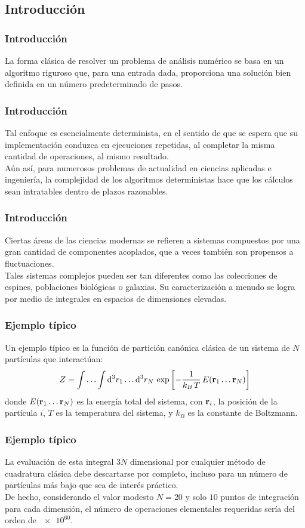 \subsection{Introducción}
\begin{frame}
\frametitle{Introducción}
La forma clásica de resolver un problema de análisis numérico se basa en un algoritmo riguroso que, para una entrada dada, proporciona una solución bien definida en un número predeterminado de pasos.
\end{frame}
\begin{frame}
\frametitle{Introducción}
Tal enfoque es esencialmente determinista, en el sentido de que se espera que su implementación conduzca en ejecuciones repetidas, al completar la misma cantidad de operaciones, al mismo resultado.
\\
\bigskip
\pause
Aún así, para numerosos problemas de actualidad en ciencias aplicadas e ingeniería, la complejidad de los algoritmos deterministas hace que los cálculos sean intratables dentro de plazos razonables.
\end{frame}
\begin{frame}
\frametitle{Introducción}
Ciertas áreas de las ciencias modernas se refieren a sistemas compuestos por una gran cantidad de componentes acoplados, que a veces también son propensos a fluctuaciones.
\\
\bigskip
Tales sistemas complejos pueden ser tan diferentes como las colecciones de espines, poblaciones biológicas o galaxias. Su caracterización a menudo se logra por medio de integrales en espacios de dimensiones elevadas.
\end{frame}
\begin{frame}
\frametitle{Ejemplo típico}
Un ejemplo típico es la función de partición canónica clásica de un sistema de $N$ partículas que interactúan:
\begin{align*}
Z = \int \ldots \int \dd[3]{r_{1}} \ldots \dd[3]{r_{N}} \, \exp \left[ - \dfrac{1}{k_{B} \, T} \, E (\vb{r}_{1} \ldots \vb{r}_{N}) \right]
\end{align*}
donde $E (\vb{r}_{1} \ldots \vb{r}_{N})$ es la energía total del sistema, con $\vb{r}_{i}$, la posición de la partícula $i$, $T$ es la temperatura del sistema, y $k_{B}$ es la constante de Boltzmann.
\end{frame}
\begin{frame}
\frametitle{Ejemplo típico}
La evaluación de esta integral $3N$ dimensional por cualquier método de cuadratura clásica debe descartarse por completo, incluso para un número de partículas más bajo que sea de interés práctico.
\\
\bigskip
\pause
De hecho, considerando el valor modesto $N=20$ y solo $10$ puntos de integración para cada dimensión, el número de operaciones elementales requeridas sería del orden de $\num{e60}$.
\end{frame}
